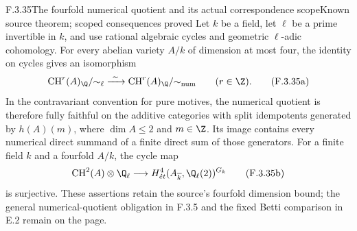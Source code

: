 \begin{result}{F.3.35}{The fourfold numerical quotient and its actual correspondence scope}{Known source theorem; scoped consequences proved}
Let \(k\) be a field, let \(\ell\) be a prime invertible in \(k\),
and use rational algebraic cycles and geometric \(\ell\)-adic cohomology.
For every abelian variety \(A/k\) of dimension at most four,
the identity on cycles gives an isomorphism
\[
 \operatorname{CH}^r(A)_{\Q}/{\sim_\ell}
   \xrightarrow{\ \sim\ }
 \operatorname{CH}^r(A)_{\Q}/{\sim_{\rm num}}
                         \qquad(r\in\Z).
 \tag{F.3.35a}
\]
In the contravariant convention for pure motives, the numerical
quotient is therefore fully faithful on the additive categories
with split idempotents generated by \(h(A)(m)\), where
\(\dim A\leq2\) and \(m\in\Z\). Its image contains every
numerical direct summand of a finite direct sum of those generators.
For a finite field \(k\) and a fourfold \(A/k\), the cycle map
\[
 \operatorname{CH}^2(A)\otimes\Q_\ell
    \longrightarrow H^4_{\acute{e}t}
           (A_{\overline k},\Q_\ell(2))^{G_k}
 \tag{F.3.35b}
\]
is surjective. These assertions retain the source's fourfold
dimension bound; the general numerical-quotient obligation in
F.3.5 and the fixed Betti comparison in E.2 remain on the page.
\end{result}
